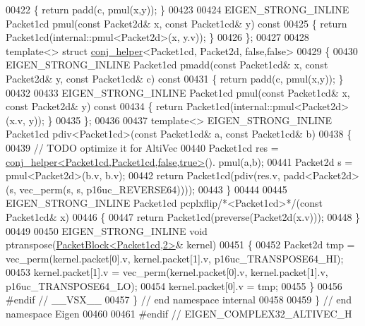 \begin{DoxyCode}
00422 \textcolor{keyword}{  }\{ \textcolor{keywordflow}{return} padd(c, pmul(x,y)); \}
00423 
00424   EIGEN\_STRONG\_INLINE Packet1cd pmul(\textcolor{keyword}{const} Packet2d& x, \textcolor{keyword}{const} Packet1cd& y)\textcolor{keyword}{ const}
00425 \textcolor{keyword}{  }\{ \textcolor{keywordflow}{return} Packet1cd(internal::pmul<Packet2d>(x, y.v)); \}
00426 \};
00427 
00428 \textcolor{keyword}{template}<> \textcolor{keyword}{struct }\hyperlink{struct_eigen_1_1internal_1_1conj__helper}{conj\_helper}<Packet1cd, Packet2d, false,false>
00429 \{
00430   EIGEN\_STRONG\_INLINE Packet1cd pmadd(\textcolor{keyword}{const} Packet1cd& x, \textcolor{keyword}{const} Packet2d& y, \textcolor{keyword}{const} Packet1cd& c)\textcolor{keyword}{ const}
00431 \textcolor{keyword}{  }\{ \textcolor{keywordflow}{return} padd(c, pmul(x,y)); \}
00432 
00433   EIGEN\_STRONG\_INLINE Packet1cd pmul(\textcolor{keyword}{const} Packet1cd& x, \textcolor{keyword}{const} Packet2d& y)\textcolor{keyword}{ const}
00434 \textcolor{keyword}{  }\{ \textcolor{keywordflow}{return} Packet1cd(internal::pmul<Packet2d>(x.v, y)); \}
00435 \};
00436 
00437 \textcolor{keyword}{template}<> EIGEN\_STRONG\_INLINE Packet1cd pdiv<Packet1cd>(\textcolor{keyword}{const} Packet1cd& a, \textcolor{keyword}{const} Packet1cd& b)
00438 \{
00439   \textcolor{comment}{// TODO optimize it for AltiVec}
00440   Packet1cd res = \hyperlink{struct_eigen_1_1internal_1_1conj__helper_3_01_packet1cd_00_01_packet1cd_00_01false_00_01true_01_4}{conj\_helper<Packet1cd,Packet1cd,false,true>}().
      pmul(a,b);
00441   Packet2d s = pmul<Packet2d>(b.v, b.v);
00442   \textcolor{keywordflow}{return} Packet1cd(pdiv(res.v, padd<Packet2d>(s, vec\_perm(s, s, p16uc\_REVERSE64))));
00443 \}
00444 
00445 EIGEN\_STRONG\_INLINE Packet1cd pcplxflip\textcolor{comment}{/*<Packet1cd>*/}(\textcolor{keyword}{const} Packet1cd& x)
00446 \{
00447   \textcolor{keywordflow}{return} Packet1cd(preverse(Packet2d(x.v)));
00448 \}
00449 
00450 EIGEN\_STRONG\_INLINE \textcolor{keywordtype}{void} ptranspose(\hyperlink{struct_eigen_1_1internal_1_1_packet_block}{PacketBlock<Packet1cd,2>}& kernel)
00451 \{
00452   Packet2d tmp = vec\_perm(kernel.packet[0].v, kernel.packet[1].v, p16uc\_TRANSPOSE64\_HI);
00453   kernel.packet[1].v = vec\_perm(kernel.packet[0].v, kernel.packet[1].v, p16uc\_TRANSPOSE64\_LO);
00454   kernel.packet[0].v = tmp;
00455 \}
00456 \textcolor{preprocessor}{#endif // \_\_VSX\_\_}
00457 \} \textcolor{comment}{// end namespace internal}
00458 
00459 \} \textcolor{comment}{// end namespace Eigen}
00460 
00461 \textcolor{preprocessor}{#endif // EIGEN\_COMPLEX32\_ALTIVEC\_H}
\end{DoxyCode}
